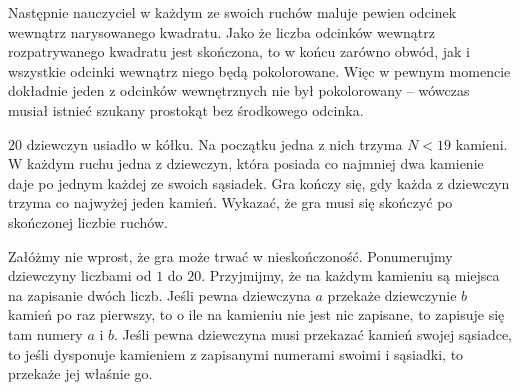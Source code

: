 \begin{center}
\hspace{40px}
\end{center}

\vspace{10px}
\noindent
Następnie nauczyciel w każdym ze swoich ruchów maluje pewien odcinek wewnątrz narysowanego kwadratu. Jako że liczba odcinków wewnątrz rozpatrywanego kwadratu jest skończona, to w końcu zarówno obwód, jak i wszystkie odcinki wewnątrz niego będą pokolorowane. Więc w pewnym momencie dokładnie jeden z odcinków wewnętrznych nie był pokolorowany -- wówczas musiał istnieć szukany prostokąt bez środkowego odcinka.

\begin{problem}{6}
	$20$ dziewczyn usiadło w kółku. Na początku jedna z nich trzyma $N < 19$ kamieni. W każdym ruchu jedna z dziewczyn, która posiada co najmniej dwa kamienie daje po jednym każdej ze swoich sąsiadek. Gra kończy się, gdy każda z dziewczyn trzyma co najwyżej jeden kamień. Wykazać, że gra musi się skończyć po skończonej liczbie ruchów.
\end{problem}

\noindent
Załóżmy nie wprost, że gra może trwać w nieskończoność.
Ponumerujmy dziewczyny liczbami od $1$ do $20$.
Przyjmijmy, że na każdym kamieniu są miejsca na zapisanie dwóch liczb. Jeśli pewna dziewczyna $a$ przekaże dziewczynie $b$ kamień po raz pierwszy, to o ile na kamieniu nie jest nic zapisane, to zapisuje się tam numery $a$ i $b$. 
Jeśli pewna dziewczyna musi przekazać kamień swojej sąsiadce, to jeśli dysponuje kamieniem z zapisanymi numerami swoimi i sąsiadki, to przekaże jej właśnie go.

